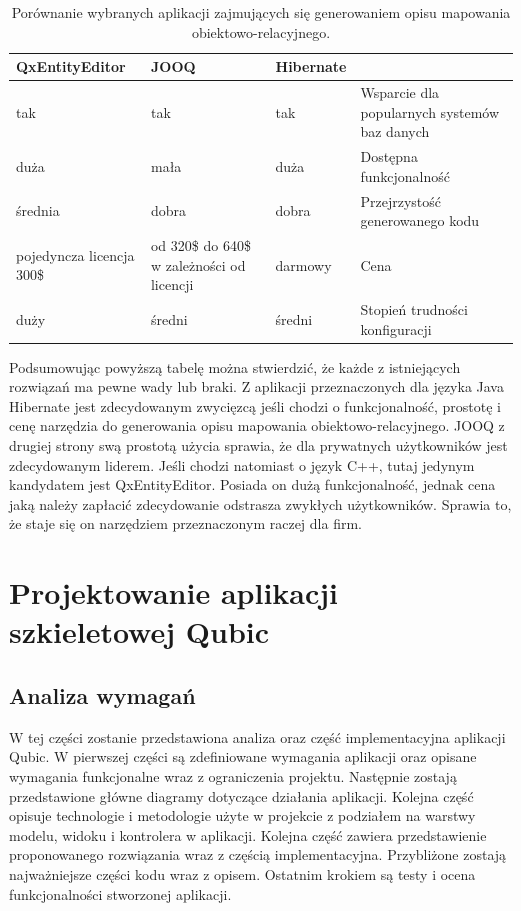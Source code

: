 \documentclass[12pt]{report}
\begin{document}
\begin{table}[!ht]
\centering
    \begin{tabular}{| p{3cm} |  p{3cm} |  p{2cm} | p{3cm} |}
    \hline
    QxEntityEditor & JOOQ & Hibernate & \\ \hline
     tak & tak & tak & Wsparcie dla popularnych systemów baz danych \\ \hline
 duża & mała & duża & Dostępna funkcjonalność \\ \hline
 średnia & dobra & dobra & Przejrzystość generowanego kodu \\ \hline
 pojedyncza licencja 300\$ & od 320\$ do 640\$ w zależności od licencji & darmowy & Cena \\ \hline
 duży & średni & średni & Stopień trudności konfiguracji \\ \hline
    \end{tabular}
    \caption{Porównanie wybranych aplikacji zajmujących się generowaniem opisu mapowania obiektowo-relacyjnego.}
\end{table}

Podsumowując powyższą tabelę można stwierdzić, że każde z istniejących rozwiązań ma pewne wady lub braki. Z aplikacji przeznaczonych dla języka Java Hibernate jest zdecydowanym zwycięzcą jeśli chodzi o funkcjonalność, prostotę i cenę narzędzia do generowania opisu mapowania obiektowo-relacyjnego. JOOQ z drugiej strony swą prostotą użycia sprawia, że dla prywatnych użytkowników jest zdecydowanym liderem. Jeśli chodzi natomiast o język C++, tutaj jedynym kandydatem jest QxEntityEditor. Posiada on dużą funkcjonalność, jednak cena jaką należy zapłacić zdecydowanie odstrasza zwykłych użytkowników. Sprawia to, że staje się on narzędziem przeznaczonym raczej dla firm.

\chapter{Projektowanie aplikacji szkieletowej Qubic} \label{rozdz.czesc.prakt}

\section{Analiza wymagań}
	\indent W tej części zostanie przedstawiona analiza oraz część implementacyjna aplikacji Qubic. W pierwszej części są zdefiniowane wymagania aplikacji oraz opisane wymagania funkcjonalne wraz z ograniczenia projektu. Następnie zostają przedstawione główne diagramy dotyczące działania aplikacji. Kolejna część opisuje technologie i metodologie użyte w projekcie z podziałem na warstwy modelu, widoku i kontrolera w aplikacji. Kolejna część zawiera przedstawienie proponowanego rozwiązania wraz z częścią implementacyjna. Przybliżone zostają najważniejsze części kodu wraz z opisem. Ostatnim krokiem są testy i ocena funkcjonalności stworzonej aplikacji.
\end{document}
